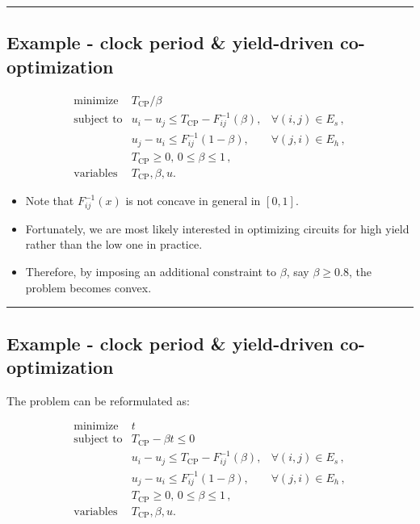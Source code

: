 \documentclass[
]{article}
\providecommand{\tightlist}{%
  \setlength{\itemsep}{0pt}\setlength{\parskip}{0pt}}
\begin{document}
\begin{center}\rule{0.5\linewidth}{0.5pt}\end{center}

\subsection{Example - clock period \& yield-driven
co-optimization}\label{example---clock-period-yield-driven-co-optimization}

\[\begin{array}{cll}
   \text{minimize} &T_\text{CP} / \beta \\
   \text{subject to} & u_i - u_j \le T_\text{CP} - F_{ij}^{-1}(\beta), & \forall (i,j) \in E_s \,,\\
                     & u_j - u_i \le F_{ij}^{-1}(1 - \beta), & \forall (j,i) \in E_h \,, \\
                     & T_\text{CP} \ge 0, \, 0 \le \beta \le 1 \, , \\
    \text{variables} &T_\text{CP}, \beta, u.
   \end{array}\]

\begin{itemize}
\tightlist
\item
  Note that \(F_{ij}^{-1}(x)\) is not concave in general in \([0, 1]\).
\item
  Fortunately, we are most likely interested in optimizing circuits for
  high yield rather than the low one in practice.
\item
  Therefore, by imposing an additional constraint to \(\beta\), say
  \(\beta \geq 0.8\), the problem becomes convex.
\end{itemize}

\begin{center}\rule{0.5\linewidth}{0.5pt}\end{center}

\subsection{Example - clock period \& yield-driven
co-optimization}\label{example---clock-period-yield-driven-co-optimization-1}

The problem can be reformulated as:

\[\begin{array}{cll}
   \text{minimize}   & t \\
   \text{subject to} & T_\text{CP} - \beta t \le 0\\
                     & u_i - u_j \le T_\text{CP} - F_{ij}^{-1}(\beta), & \forall (i,j) \in E_s \,,\\
                     & u_j - u_i \le F_{ij}^{-1}(1 - \beta), & \forall (j,i) \in E_h \,, \\
                     & T_\text{CP} \ge 0, \, 0 \le \beta \le 1 \, , \\
    \text{variables} &T_\text{CP}, \beta, u.
   \end{array}\]
\end{document}

